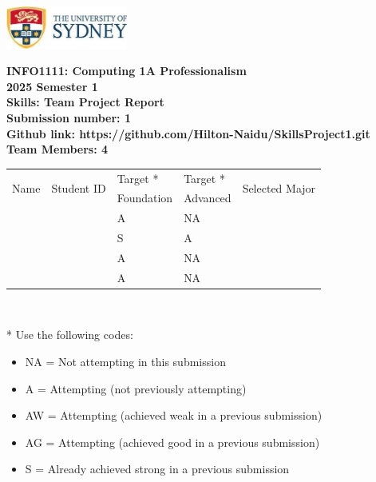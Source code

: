\documentclass[a4paper, 11pt]{report}
\begin{document}
\begin{titlepage}
\begin{flushright}
\includegraphics[width=4cm]{USyd.jpg}\\[1cm]
\end{flushright}

\begin{centering}
\textbf{\huge INFO1111: Computing 1A Professionalism}\\[0.75cm]
\textbf{\huge 2025 Semester 1}\\[2cm]
\textbf{\huge Skills: Team Project Report}\\[2cm]

\textbf{\large Submission number: 1}\\[0.5cm]
\textbf{\large Github link: https://github.com/Hilton-Naidu/SkillsProject1.git }\\[0.75cm]
\textbf{\huge Team Members: 4}\\[0.75cm]

\begin{tabular}{|p{}|p{}|p{}|p{}|p{}|}
	\hline
	\multirow{2}{*}{Name} & \multirow{2}{*}{Student ID} & Target * & Target * & \multirow{2}{*}{Selected Major} \\
	 & & Foundation & Advanced & \\
	\hline
	\hline
	\raggedright{\studA} & \sidA & A & NA & \majA \\
	\hline
	\raggedright{\studB} & \sidB & S & A & \majB \\
	\hline
	\raggedright{\studC} & \sidC & A & NA & \majC \\
	\hline
	\raggedright{\studD} & \sidD & A & NA & \majD \\
	\hline
\end{tabular}
\\[0.5cm]
\end{centering}

* Use the following codes:
\begin{itemize}
\setlength\itemsep{0em}
\item NA = Not attempting in this submission
\item A = Attempting (not previously attempting)
\item AW = Attempting (achieved weak in a previous submission) 
\item AG = Attempting (achieved good in a previous submission)
\item S = Already achieved strong in a previous submission
\end{itemize}

\thispagestyle{empty}
\end{titlepage}
\end{document}
